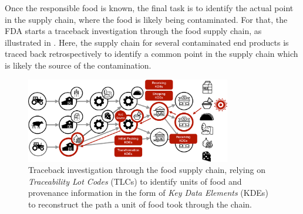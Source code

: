  Once the responsible food is known, the final task is to identify the actual point in the supply chain, where the food is likely being contaminated. For that, the FDA starts a traceback investigation through the food supply chain, as illustrated in . Here, the supply chain for several contaminated end products is traced back retrospectively to identify a common point in the supply chain which is likely the source of the contamination. 

\begin{figure}[h!]
    \centering
    \includegraphics[width=0.8\textwidth]{submissions/submission3/figures/traceback-crop.pdf}
    \caption{Traceback investigation through the food supply chain, relying on \textit{Traceability Lot Codes} (TLCs) to identify units of food and provenance information in the form of \textit{Key Data Elements} (KDEs) to reconstruct the path a unit of food took through the chain.}
    \label{fig:traceback}
\end{figure}

